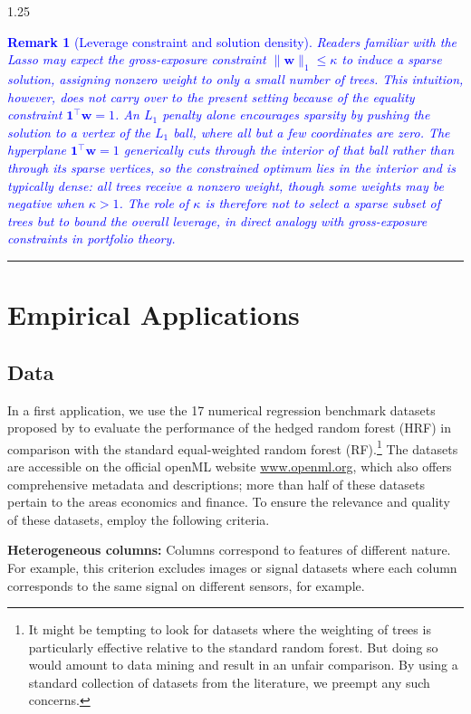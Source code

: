 \documentclass[12pt]{article}
\newenvironment{packed_itemize}{
\begin{itemize}
  \setlength{\itemsep}{1pt}
  \setlength{\parskip}{0pt} 
  \setlength{\parsep}{0pt}
}{\end{itemize}}
\newtheorem{remark}{Remark}[section]
\numberwithin{equation}{section}
\theoremstyle{plain}
\def\qed{\rule{2mm}{2mm}}
\begin{document}
\begin{spacing}{1.25}
\textcolor{blue}{%
\begin{remark}[Leverage constraint and solution density]
\label{rem:dense}
\rm
Readers familiar with the Lasso may expect the gross-exposure constraint
$\|\mathbf{w}\|_1 \leq \kappa$ to induce a sparse solution, assigning
nonzero weight to only a small number of trees.
This intuition, however, does not carry over to the present setting because
of the equality constraint $\mathbf{1}^{\top}\mathbf{w} = 1$.
An $L_1$ penalty alone encourages sparsity by pushing the solution to a
vertex of the $L_1$ ball, where all but a few coordinates are zero.
The hyperplane $\mathbf{1}^{\top}\mathbf{w} = 1$ generically cuts through
the interior of that ball rather than through its sparse vertices, so the
constrained optimum lies in the interior and is typically \emph{dense}:
all trees receive a nonzero weight, though some weights may be negative
when $\kappa > 1$.
The role of $\kappa$ is therefore not to select a sparse subset of trees
but to bound the overall leverage, in direct analogy with
gross-exposure constraints in portfolio theory.~\qed
\end{remark}
}

\section{Empirical Applications}
\label{sec:application}
\subsection{Data}
\label{sec:data}
In a first application, we use the 17 numerical
regression benchmark datasets proposed by
\cite{grinsztajn:2022}
to evaluate the performance of the hedged random forest (HRF)
in comparison with the standard equal-weighted
random forest (RF).\footnote{It might be tempting to look for datasets where the weighting of trees is particularly effective relative to the standard random forest. But doing so would amount to data mining and result in an unfair comparison. By using a standard collection of datasets from the literature, we preempt any such concerns.}
The datasets are accessible on the official openML website
\url{www.openml.org}, which also offers comprehensive metadata and
descriptions; more than half of these datasets pertain to the areas economics and finance. 
To ensure the relevance and quality of these datasets,
\citet{grinsztajn:2022} employ the following criteria.
\begin{packed_itemize}
\item \textbf{Heterogeneous columns:} Columns correspond to features
  of different nature. For example, this criterion
  excludes images or signal datasets where
  each column corresponds to the same signal on different sensors, for example.
  

\end{packed_itemize}
\end{spacing}
\end{document}
